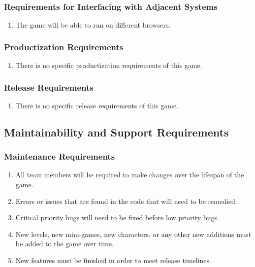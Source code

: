 \documentclass[]{article}
\begin{document}
\subsubsection{Requirements for Interfacing with Adjacent Systems}
\label{ssub:requirements_for_interfacing_with_adjacent_systems}
\begin{enumerate}[{OE}1. ]
	\item The game will be able to run on different browsers.
\end{enumerate}

\subsubsection{Productization Requirements}
\label{ssub:productization_requirements}
\begin{enumerate}[{OE}1. ]
	\item There is no specific productization requirements of this game.
\end{enumerate}

\subsubsection{Release Requirements}
\label{ssub:release_requirements}
\begin{enumerate}[{OE}1. ]
	\item There is no specific release requirements of this game.
\end{enumerate}


\subsection{Maintainability and Support Requirements}
\label{sub:maintainability_and_support_requirements}


\subsubsection{Maintenance Requirements}
\label{ssub:maintenance_requirements}
\begin{enumerate}[{MS}1. ]
	\item All team members will be required to make changes over the lifespan of the game.
	\item Errors or issues that are found in the code that will need to be remedied.
	\item Critical priority bugs will need to be fixed before low priority bugs.
	\item New levels, new mini-games, new characters, or any other new additions must be added to the game over time.
	\item New features must be finished in order to meet release timelines.
\end{enumerate}
\end{document}
